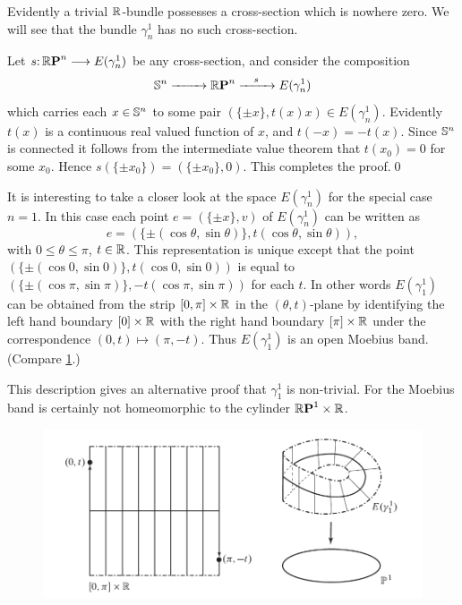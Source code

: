 Evidently a trivial $\boldsymbol{\mathbb{R}}$-bundle possesses a cross-section which is nowhere zero. We will see that the bundle $\gamma^1_n$ has no such cross-section.

Let
$s\mathpunct{:}\boldsymbol{\mathbb{R}}\boldsymbol{\mathrm{P}}^{n}\longrightarrow E(\gamma^1_n)$
be any cross-section, and consider the composition
\[\Sphere{n}\xrightarrow{\quad \ \quad}\rp{n}\xrightarrow{\quad s\quad} E(\gamma^1_n)\]
which carries each $x \in\mathbb{S}^{n}$ to some pair $\left(\{\pm x\},t(x)x\right)\in E(\gamma^1_n)$. Evidently $t(x)$ is a continuous real valued function of $x$, and $t(-x)=-t(x)$.
Since $\mathbb{S}^{n}$ is connected it follows from the intermediate value theorem
that $ t(x_0) = 0 $ for some
$x_0$. Hence $s(\{\pm x_0\})=(\{\pm x_0\},0)$. This completes
		the proof.\qed
		

It is interesting to take a closer look at the space $E(\gamma^1_n)$ for the 
special case $n = 1$. In this case each point $e =
(\{\pm x\}, v)$ of $E(\gamma^1_n)$ can be
written as
\[e =
(\{\pm(\cos \theta, \sin \theta)\}, t(\cos \theta, \sin \theta)), \]
with $0 \leq \theta \leq \pi$, $t\in \boldsymbol{\mathbb{R}}$. This representation is unique except that the point
$(\{\pm(\cos 0, \sin 0)\}, t(\cos 0, \sin 0))$ is equal to $(\{\pm(\cos \pi, \sin \pi)\}, -t(\cos \pi, \sin \pi))$ for each $t$. In other words $E(\gamma^1_1)$ can be obtained from
	the strip $[0,\pi]\times \boldsymbol{\mathbb{R}}$ in the $(\theta, t)$-plane by identifying the left hand 
	boundary $[0]\times \boldsymbol{\mathbb{R}}$ with the right hand boundary $[\pi]\times \boldsymbol{\mathbb{R}}$ under the 
	correspondence $(0,t) \mapsto (\pi,-t)$. Thus $E(\gamma^1_1)$ is an open Moebius band. (Compare
	\cref{fig2}.)
	
	This description gives an alternative proof that $\gamma^1_1$ is non-trivial.
	For the Moebius band is certainly not homeomorphic to the cylinder
	$\boldsymbol{\mathbb{R}}\boldsymbol{\mathrm{P}}^{1}\times \boldsymbol{\mathbb{R}}$.
	
	\begin{figure}[!htb]
		\centering\includegraphics[scale=.5]{fig2}
		\caption{}\label{fig2}
	\end{figure}

